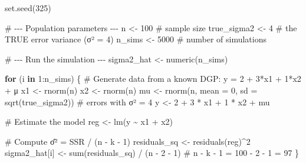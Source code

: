 \documentclass[
  letterpaper,
  DIV=11,
  numbers=noendperiod]{scrreprt}
\newenvironment{Shaded}{\begin{snugshade}}{\end{snugshade}}
\newcommand{\AttributeTok}[1]{\textcolor[rgb]{0.40,0.45,0.13}{#1}}
\newcommand{\CommentTok}[1]{\textcolor[rgb]{0.37,0.37,0.37}{#1}}
\newcommand{\ControlFlowTok}[1]{\textcolor[rgb]{0.00,0.23,0.31}{\textbf{#1}}}
\newcommand{\DecValTok}[1]{\textcolor[rgb]{0.68,0.00,0.00}{#1}}
\newcommand{\FunctionTok}[1]{\textcolor[rgb]{0.28,0.35,0.67}{#1}}
\newcommand{\NormalTok}[1]{\textcolor[rgb]{0.00,0.23,0.31}{#1}}
\newcommand{\OtherTok}[1]{\textcolor[rgb]{0.00,0.23,0.31}{#1}}
\newcommand{\SpecialCharTok}[1]{\textcolor[rgb]{0.37,0.37,0.37}{#1}}
\begin{document}
\begin{Shaded}
\begin{Highlighting}[]
\FunctionTok{set.seed}\NormalTok{(}\DecValTok{325}\NormalTok{)}

\CommentTok{\# {-}{-}{-} Population parameters {-}{-}{-}}
\NormalTok{n }\OtherTok{\textless{}{-}} \DecValTok{100}          \CommentTok{\# sample size}
\NormalTok{true\_sigma2 }\OtherTok{\textless{}{-}} \DecValTok{4}  \CommentTok{\# the TRUE error variance (σ² = 4)}
\NormalTok{n\_sims }\OtherTok{\textless{}{-}} \DecValTok{5000}    \CommentTok{\# number of simulations}

\CommentTok{\# {-}{-}{-} Run the simulation {-}{-}{-}}
\NormalTok{sigma2\_hat }\OtherTok{\textless{}{-}} \FunctionTok{numeric}\NormalTok{(n\_sims)}

\ControlFlowTok{for}\NormalTok{ (i }\ControlFlowTok{in} \DecValTok{1}\SpecialCharTok{:}\NormalTok{n\_sims) \{}
  \CommentTok{\# Generate data from a known DGP: y = 2 + 3*x1 + 1*x2 + μ}
\NormalTok{  x1 }\OtherTok{\textless{}{-}} \FunctionTok{rnorm}\NormalTok{(n)}
\NormalTok{  x2 }\OtherTok{\textless{}{-}} \FunctionTok{rnorm}\NormalTok{(n)}
\NormalTok{  mu }\OtherTok{\textless{}{-}} \FunctionTok{rnorm}\NormalTok{(n, }\AttributeTok{mean =} \DecValTok{0}\NormalTok{, }\AttributeTok{sd =} \FunctionTok{sqrt}\NormalTok{(true\_sigma2))  }\CommentTok{\# errors with σ² = 4}
\NormalTok{  y }\OtherTok{\textless{}{-}} \DecValTok{2} \SpecialCharTok{+} \DecValTok{3} \SpecialCharTok{*}\NormalTok{ x1 }\SpecialCharTok{+} \DecValTok{1} \SpecialCharTok{*}\NormalTok{ x2 }\SpecialCharTok{+}\NormalTok{ mu}

  \CommentTok{\# Estimate the model}
\NormalTok{  reg }\OtherTok{\textless{}{-}} \FunctionTok{lm}\NormalTok{(y }\SpecialCharTok{\textasciitilde{}}\NormalTok{ x1 }\SpecialCharTok{+}\NormalTok{ x2)}

  \CommentTok{\# Compute σ̂² = SSR / (n {-} k {-} 1)}
\NormalTok{  residuals\_sq }\OtherTok{\textless{}{-}} \FunctionTok{residuals}\NormalTok{(reg)}\SpecialCharTok{\^{}}\DecValTok{2}
\NormalTok{  sigma2\_hat[i] }\OtherTok{\textless{}{-}} \FunctionTok{sum}\NormalTok{(residuals\_sq) }\SpecialCharTok{/}\NormalTok{ (n }\SpecialCharTok{{-}} \DecValTok{2} \SpecialCharTok{{-}} \DecValTok{1}\NormalTok{)  }\CommentTok{\# n {-} k {-} 1 = 100 {-} 2 {-} 1 = 97}
\NormalTok{\}}


\end{Highlighting}
\end{Shaded}
\end{document}
